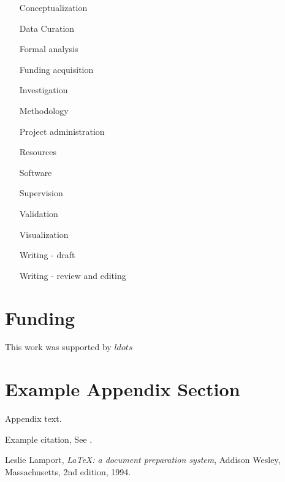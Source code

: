 \documentclass[preprint,12pt]{elsarticle}
\begin{document}
\begin{itemize}
\item[Conceptualization]{}
\item[Data Curation]{}
\item[Formal analysis ]{}
\item[Funding acquisition]{}
\item[Investigation]{}
\item[Methodology]{}
\item[Project administration]{}
\item[Resources]{}
\item[Software]{}
\item[Supervision]{}
\item[Validation]{}
\item[Visualization]{}
\item[Writing - draft]{}
\item[Writing - review and editing]{}
\end{itemize}

\section{Funding}

This work was supported by $ldots$

\appendix
\section{Example Appendix Section}
\label{app1}

Appendix text.


Example citation, See \cite{lamport94}.




\begin{thebibliography}{00}


  Leslie Lamport,
  \textit{\LaTeX: a document preparation system},
  Addison Wesley, Massachusetts,
  2nd edition,
  1994.

\end{thebibliography}
\end{document}
